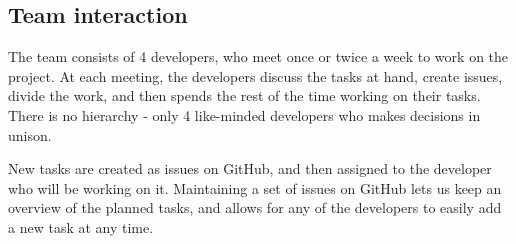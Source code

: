 \subsection{Team interaction}

The team consists of 4 developers, who meet once or twice a week to work on the project. At each meeting, the developers discuss the tasks at hand, create issues, divide the work, and then spends the rest of the time working on their tasks. There is no hierarchy - only 4 like-minded developers who makes decisions in unison.

New tasks are created as issues on GitHub, and then assigned to the developer who will be working on it. Maintaining a set of issues on GitHub lets us keep an overview of the planned tasks, and allows for any of the developers to easily add a new task at any time.
